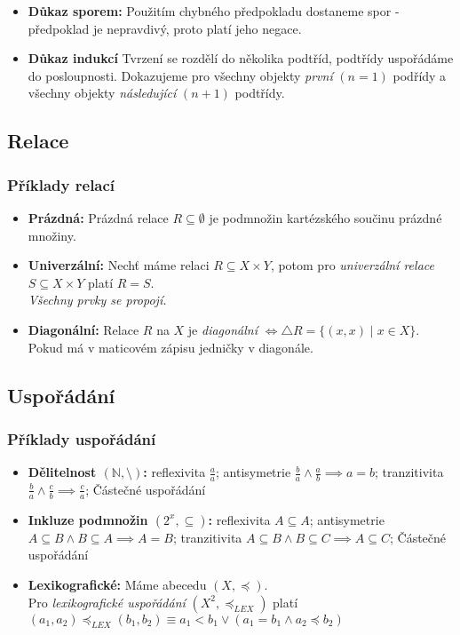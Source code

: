 \documentclass[10pt,a4paper]{article}
\begin{document}
\begin{itemize}
    \item \textbf{Důkaz sporem:} Použitím chybného předpokladu dostaneme spor - předpoklad je nepravdivý, proto platí jeho negace.
    \item \textbf{Důkaz indukcí} Tvrzení se rozdělí do několika podtříd, podtřídy uspořádáme do posloupnosti. Dokazujeme pro všechny objekty \textit{první} $(n=1)$ podřídy a všechny objekty \textit{následující} $(n+1)$ podtřídy.
\end{itemize}

\subsection{Relace}

\subsubsection{Příklady relací}
\begin{itemize}
    \item \textbf{Prázdná:} Prázdná relace $R\subseteq \emptyset$ je podmnožin kartézského součinu prázdné množiny.
    \item \textbf{Univerzální:} Nechť máme relaci $R\subseteq X\times Y$, potom pro \textit{univerzální relace} $S\subseteq X\times Y$ platí $R=S$.\\ \textit{Všechny prvky se propojí.}
    \item \textbf{Diagonální:} Relace $R$ na $X$ je \textit{diagonální} $\iff \triangle R = \{(x,x) \mid x\in X\}$. Pokud má v maticovém zápisu jedničky v diagonále.
\end{itemize}

\subsection{Uspořádání}

\subsubsection{Příklady uspořádání}

\begin{itemize}
    \item \textbf{Dělitelnost $(\mathbb{N}, \setminus)$:} reflexivita $\frac aa$; antisymetrie $\frac ba \land \frac ab \implies a = b$; tranzitivita $\frac ba \land \frac cb \implies \frac ca$; Částečné uspořádání
    \item \textbf{Inkluze podmnožin $(2^x, \subseteq)$:} reflexivita $A\subseteq A$; antisymetrie $A\subseteq B \land B \subseteq A \implies A = B$; tranzitivita $A \subseteq B \land B \subseteq C \implies A \subseteq C$; Částečné uspořádání
    \item \textbf{Lexikografické:} Máme abecedu $(X, \preceq)$.\\Pro \textit{lexikografické uspořádání} $(X^2, \preceq _{LEX})$ platí $(a_1, a_2) \preceq _{LEX} (b_1, b_2) \equiv a_1 < b_1 \lor (a_1 = b_1 \land a_2 \preceq b_2)$
\end{itemize}
\end{document}
